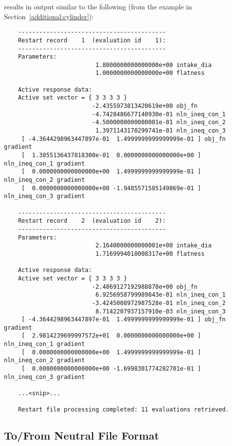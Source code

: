 results in output similar to the following (from the
example in Section~\ref{additional:cylinder}):
\begin{small}
\begin{verbatim}
    ------------------------------------------
    Restart record    1  (evaluation id    1):
    ------------------------------------------
    Parameters:
                          1.8000000000000000e+00 intake_dia
                          1.0000000000000000e+00 flatness

    Active response data:
    Active set vector = { 3 3 3 3 }
                         -2.4355973813420619e+00 obj_fn
                         -4.7428486677140930e-01 nln_ineq_con_1
                         -4.5000000000000001e-01 nln_ineq_con_2
                          1.3971143170299741e-01 nln_ineq_con_3
     [ -4.3644298963447897e-01  1.4999999999999999e-01 ] obj_fn gradient
     [  1.3855136437818300e-01  0.0000000000000000e+00 ] nln_ineq_con_1 gradient
     [  0.0000000000000000e+00  1.4999999999999999e-01 ] nln_ineq_con_2 gradient
     [  0.0000000000000000e+00 -1.9485571585149869e-01 ] nln_ineq_con_3 gradient

    ------------------------------------------
    Restart record    2  (evaluation id    2):
    ------------------------------------------
    Parameters:
                          2.1640000000000001e+00 intake_dia
                          1.7169994018008317e+00 flatness

    Active response data:
    Active set vector = { 3 3 3 3 }
                         -2.4869127192988878e+00 obj_fn
                          6.9256958799989843e-01 nln_ineq_con_1
                         -3.4245008972987528e-01 nln_ineq_con_2
                          8.7142207937157910e-03 nln_ineq_con_3
     [ -4.3644298963447897e-01  1.4999999999999999e-01 ] obj_fn gradient
     [  2.9814239699997572e+01  0.0000000000000000e+00 ] nln_ineq_con_1 gradient
     [  0.0000000000000000e+00  1.4999999999999999e-01 ] nln_ineq_con_2 gradient
     [  0.0000000000000000e+00 -1.6998301774282701e-01 ] nln_ineq_con_3 gradient

    ...<snip>...

    Restart file processing completed: 11 evaluations retrieved.
\end{verbatim}
\end{small}

\subsection{To/From Neutral File Format}\label{restart:utility:neutral}

